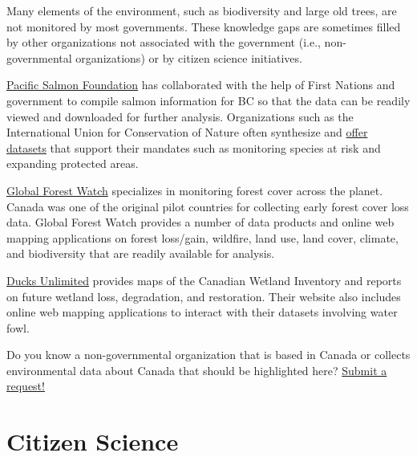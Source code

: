 \documentclass[
]{book}
\begin{document}
Many elements of the environment, such as biodiversity and large old trees, are not monitored by most governments. These knowledge gaps are sometimes filled by other organizations not associated with the government (i.e., non-governmental organizations) or by citizen science initiatives.

\href{https://www.salmonexplorer.ca/\#!/}{Pacific Salmon Foundation} has collaborated with the help of First Nations and government to compile salmon information for BC so that the data can be readily viewed and downloaded for further analysis. Organizations such as the International Union for Conservation of Nature often synthesize and \href{https://www.iucn.org/resources/conservation-tools}{offer datasets} that support their mandates such as monitoring species at risk and expanding protected areas.

\href{https://www.globalforestwatch.org/}{Global Forest Watch} specializes in monitoring forest cover across the planet. Canada was one of the original pilot countries for collecting early forest cover loss data. Global Forest Watch provides a number of data products and online web mapping applications on forest loss/gain, wildfire, land use, land cover, climate, and biodiversity that are readily available for analysis.

\href{https://www.ducks.ca}{Ducks Unlimited} provides maps of the Canadian Wetland Inventory and reports on future wetland loss, degradation, and restoration. Their website also includes online web mapping applications to interact with their datasets involving water fowl.

Do you know a non-governmental organization that is based in Canada or collects environmental data about Canada that should be highlighted here? \href{https://github.com/ubc-geomatics-textbook/geomatics-textbook/issues/new/choose}{Submit a request!}

\hypertarget{citizen-science}{%
\section{Citizen Science}\label{citizen-science}}
\end{document}
